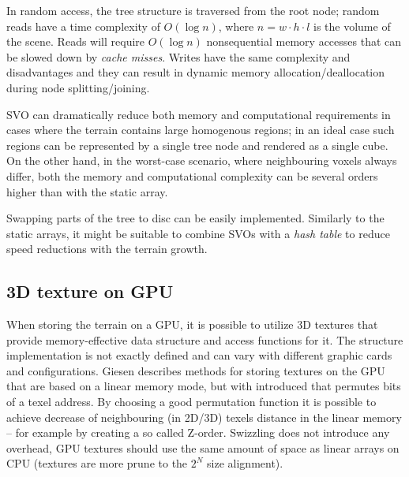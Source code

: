 In random access, the tree structure is traversed from the root node; random reads have a time complexity of $O(\log n)$, where $n = w \cdot h \cdot l$ is the volume of the scene. Reads will require $O(\log n)$ nonsequential memory accesses that can be slowed down by \textit{cache misses}. Writes have the same complexity and disadvantages  and they can result in dynamic memory allocation/deallocation during node splitting/joining.

SVO can dramatically reduce both memory and computational requirements in cases where the terrain contains large homogenous regions; in an ideal case such regions can be represented by a single tree node and rendered as a single cube. On the other hand, in the worst-case scenario, where neighbouring voxels always differ, both the memory and computational complexity can be several orders higher than with the static array.

Swapping parts of the tree to disc can be easily implemented. Similarly to the static arrays, it might be suitable to combine SVOs with a \textit{hash table} to reduce speed reductions with the terrain growth.

\subsection{3D texture on GPU}
When storing the terrain on a GPU, it is possible to utilize 3D textures that provide memory-effective data structure and access functions for it. The structure implementation is not exactly defined and can vary with different graphic cards and configurations. Giesen \cite{Giesen1712011} describes methods for storing textures on the GPU that are based on a linear memory mode, but with  introduced that permutes bits of a texel address. By choosing a good permutation function it is possible to achieve decrease of neighbouring (in 2D/3D) texels distance in the linear memory -- for example by creating a so called Z-order. Swizzling does not introduce any overhead, GPU textures should use the same amount of space as linear arrays on CPU (textures are more prune to the $2^N$ size alignment).

